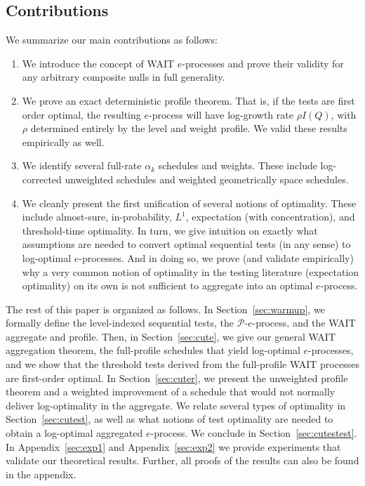 \documentclass{article}
\newcommand{\PP}{\mathcal P}
\theoremstyle{definition}
\begin{document}
\subsection*{Contributions}
We summarize our main contributions as follows:
\begin{enumerate}
    \item We introduce the concept of WAIT $e$-processes and prove their validity for any arbitrary composite nulls in full generality.
    \item We prove an exact deterministic profile theorem. That is, if the tests are first order optimal, the resulting $e$-process will have log-growth rate $\rho I(Q)$, with $\rho$ determined entirely by the level and weight profile. We valid these results empirically as well.
    \item We identify several full-rate $\alpha_k$ schedules and weights. These include log-corrected unweighted schedules and weighted geometrically space schedules.
    \item We cleanly present the first unification of several notions of optimality. These include almost-sure, in-probability, $L^{1}$, expectation (with concentration), and threshold-time optimality. In turn, we give intuition on exactly what assumptions are needed to convert optimal sequential tests (in any sense) to log-optimal $e$-processes. And in doing so, we prove (and validate empirically) why a very common notion of optimality in the testing literature (expectation optimality) on its own is not sufficient to aggregate into an optimal $e$-process. 
\end{enumerate}

The rest of this paper is organized as follows. In Section~\ref{sec:warmup}, we formally define the level-indexed sequential tests, the $\PP$-$e$-process, and the WAIT aggregate and profile. Then, in Section~\ref{sec:cute}, we give our general WAIT aggregation theorem, the full-profile schedules that yield log-optimal $e$-processes, and we show that the threshold tests derived from the full-profile WAIT processes are first-order optimal. In Section~\ref{sec:cuter}, we present the unweighted profile theorem and a weighted improvement of a schedule that would not normally deliver log-optimality in the aggregate. We relate several types of optimality in Section~\ref{sec:cutest}, as well as what notions of test optimality are needed to obtain a log-optimal aggregated $e$-process. We conclude in Section~\ref{sec:cutestest}. In Appendix~\ref{sec:exp1} and Appendix~\ref{sec:exp2} we provide experiments that validate our theoretical results. Further, all proofs of the results can also be found in the appendix.
\end{document}

